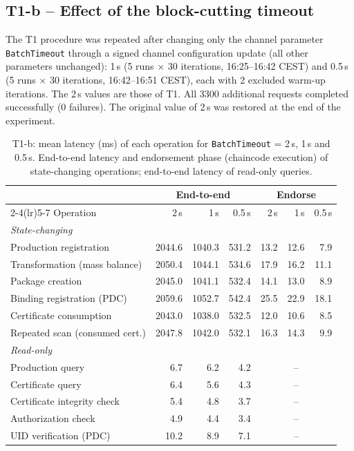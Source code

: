 \subsection{T1-b -- Effect of the block-cutting timeout}
The T1 procedure was repeated after changing only the channel parameter \texttt{BatchTimeout} through a signed
channel configuration update (all other parameters unchanged): 1\,s (5 runs $\times$ 30
iterations, 16:25--16:42 CEST) and 0.5\,s (5 runs $\times$
30 iterations, 16:42--16:51 CEST), each with 2 excluded warm-up
iterations. The 2\,s values are those of T1. All 3300 additional requests completed successfully
(0 failures). The original value of 2\,s was restored at the end of the experiment.

\begin{table}[H]
\centering\small
\caption{T1-b: mean latency (ms) of each operation for \texttt{BatchTimeout} = 2\,s, 1\,s and 0.5\,s.
End-to-end latency and endorsement phase (chaincode execution) of state-changing operations; end-to-end latency
of read-only queries.}
\label{tab:t1b}
\setlength{\tabcolsep}{4pt}
\begin{tabular}{lrrrrrr}
\toprule
 & \multicolumn{3}{c}{End-to-end} & \multicolumn{3}{c}{Endorse} \\
\cmidrule(lr){2-4}\cmidrule(lr){5-7}
Operation & 2\,s & 1\,s & 0.5\,s & 2\,s & 1\,s & 0.5\,s \\
\midrule
\multicolumn{7}{l}{\emph{State-changing}} \\
Production registration & 2044.6 & 1040.3 & 531.2 & 13.2 & 12.6 & 7.9 \\
Transformation (mass balance) & 2050.4 & 1044.1 & 534.6 & 17.9 & 16.2 & 11.1 \\
Package creation & 2045.0 & 1041.1 & 532.4 & 14.1 & 13.0 & 8.9 \\
Binding registration (PDC) & 2059.6 & 1052.7 & 542.4 & 25.5 & 22.9 & 18.1 \\
Certificate consumption & 2043.0 & 1038.0 & 532.5 & 12.0 & 10.6 & 8.5 \\
Repeated scan (consumed cert.) & 2047.8 & 1042.0 & 532.1 & 16.3 & 14.3 & 9.9 \\
\midrule
\multicolumn{7}{l}{\emph{Read-only}} \\
Production query & 6.7 & 6.2 & 4.2 & \multicolumn{3}{c}{--} \\
Certificate query & 6.4 & 5.6 & 4.3 & \multicolumn{3}{c}{--} \\
Certificate integrity check & 5.4 & 4.8 & 3.7 & \multicolumn{3}{c}{--} \\
Authorization check & 4.9 & 4.4 & 3.4 & \multicolumn{3}{c}{--} \\
UID verification (PDC) & 10.2 & 8.9 & 7.1 & \multicolumn{3}{c}{--} \\
\bottomrule
\end{tabular}
\end{table}

